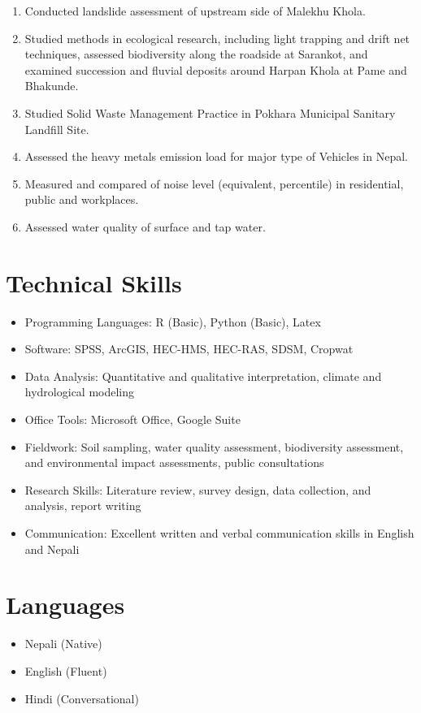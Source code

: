 \documentclass[a4paper,10pt]{article}
\begin{document}
\begin{enumerate}
    \item Conducted landslide assessment of upstream side of Malekhu Khola.
    \item Studied methods in ecological research, including light trapping and drift net techniques, assessed biodiversity along the roadside at Sarankot, and examined succession and fluvial deposits around Harpan Khola at Pame and Bhakunde.
    \item Studied Solid Waste Management Practice in Pokhara Municipal Sanitary Landfill Site.
    \item Assessed the heavy metals emission load for major type of Vehicles in Nepal.
    \item Measured and compared of noise level (equivalent, percentile) in residential, public and workplaces.
    \item Assessed water quality of surface and tap water.
 
\end{enumerate}

\section{Technical Skills}
\begin{itemize}
    \item Programming Languages: R (Basic), Python (Basic), Latex
    \item Software: SPSS, ArcGIS, HEC-HMS, HEC-RAS, SDSM, Cropwat
    \item Data Analysis: Quantitative and qualitative interpretation, climate and hydrological modeling
    \item Office Tools: Microsoft Office, Google Suite
    \item Fieldwork: Soil sampling, water quality assessment, biodiversity assessment, and environmental impact assessments, public consultations
    \item Research Skills: Literature review, survey design, data collection, and analysis, report writing
    \item Communication: Excellent written and verbal communication skills in English and Nepali
\end{itemize}

\section{Languages}
\begin{multicols}{3}
\begin{itemize}
    \item Nepali (Native)
    \item English (Fluent)
    \item Hindi (Conversational)
\end{itemize}
\end{multicols}
\end{document}
